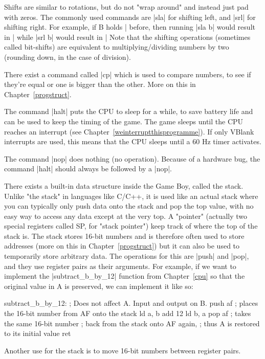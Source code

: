 \documentclass[11pt]{book}
\begin{document}
Shifts are similar to rotations, but do not "wrap around" and instead just pad with zeros. The commonly used commands are |sla| for shifting left, and |srl| for shifting right. For example, if B holds |%
before, then running |sla b| would result in |%
while |srl b| would result in |%
Note that the shifting operations (sometimes called bit-shifts) are equivalent to multiplying/dividing numbers by two (rounding down, in the case of division). 

There exist a command called |cp| which is used to compare numbers, to see if they're equal or one is bigger than the other. More on this in Chapter~\ref{progstruct}.

The command |halt| puts the CPU to sleep for a while, to save battery life and can be used to keep the timing of the game. The game sleeps until the CPU reaches an interrupt (see Chapter~\ref{weinterruptthisprogramme}). If only VBlank interrupts are used, this means that the CPU sleeps until a 60 Hz timer activates.

The command |nop| does nothing (no operation). Because of a hardware bug, the command |halt| should always be followed by a |nop|.

There exists a built-in data structure inside the Game Boy, called the stack. Unlike "the stack" in languages like C/C++, it is used like an actual stack where you can typically only push data onto the stack and pop the top value, with no easy way to access any data except at the very top. A "pointer" (actually two special registers called SP, for "stack pointer") keep track of where the top of the stack is. The stack stores 16-bit numbers and is therefore often used to store addresses (more on this in Chapter~\ref{progstruct}) but it can also be used to temporarily store arbitrary data. The operations for this are |push| and |pop|, and they use register pairs as their arguments. For example, if we want to implement the |subtract_b_by_12| function from Chapter~\ref{cpu} so that the original value in A is preserved, we can implement it like so:

\begin{code}
subtract_b_by_12:
  ; Does not affect A. Input and output on B.
  push af ; places the 16-bit number from AF onto the stack
  ld a, b
  add 12
  ld b, a
  pop af ; takes the same 16-bit number
  ; back from the stack onto AF again,
  ; thus A is restored to its initial value
  ret 
\end{code}

Another use for the stack is to move 16-bit numbers between register pairs. 
\end{document}
